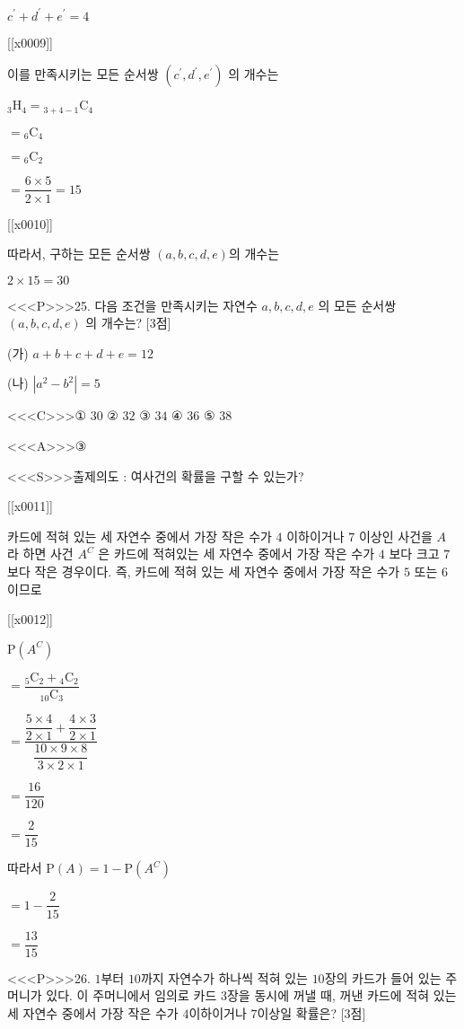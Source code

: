 \documentclass{oblivoir}
\begin{document}
$c^{\prime}+d^{\prime}+e^{\prime}=4$

[[x0009]]

이를 만족시키는 모든 순서쌍 $\left(c^{\prime}, d^{\prime}, e^{\prime}\right)$
의 개수는

${ }_{3} \mathrm{H}_{4}={ }_{3+4-1} \mathrm{C}_{4}$

$={ }_{6} \mathrm{C}_{4}$

$={ }_{6} \mathrm{C}_{2}$

$=\dfrac{6 \times 5}{2 \times 1}=15$

[[x0010]]

따라서, 구하는 모든 순서쌍 $(a, b, c, d, e)$의 개수는

$2 \times 15=30$



<<<P>>>25. 다음 조건을 만족시키는 자연수 $a, b, c, d, e$ 의 모든 순서쌍 $(a, b, c, d, e)$ 의 개수는? [3점]

(가) $a+b+c+d+e=12$

(나) $\left|a^{2}-b^{2}\right|=5$

<<<C>>>① $30$
② $32$
③ $34$
④ $36$
⑤ $38$

<<<A>>>③

<<<S>>>출제의도 : 여사건의 확률을 구할 수 있는가?

[[x0011]]

카드에 적혀 있는 세 자연수 중에서 가장 작은 수가 $4$ 이하이거나 $7$ 이상인 사건을 $A$ 라 하면 사건 $A^{C}$ 은 카드에 적혀있는 세 자연수 중에서 가장 작은 수가 $4$ 보다 크고 $7$ 보다 작은 경우이다. 즉, 카드에 적혀 있는 세 자연수 중에서 가장 작은 수가 $5$ 또는 $6$ 이므로

[[x0012]]

$\mathrm{P}\left(A^{C}\right)$

$=\dfrac{{ }_{5} \mathrm{C}_{2}+{ }_{4} \mathrm{C}_{2}}{{ }_{10} \mathrm{C}_{3}}$

$=\dfrac{\dfrac{5 \times 4}{2 \times 1}+\dfrac{4 \times 3}{2 \times 1}}{\dfrac{10 \times 9 \times 8}{3 \times 2 \times 1}}$

$=\dfrac{16}{120}$

$=\dfrac{2}{15}$

따라서
$\mathrm{P}(A)=1-\mathrm{P}\left(A^{C}\right)$

$=1-\dfrac{2}{15}$

$=\dfrac{13}{15}$


<<<P>>>26. $1$부터 $10$까지 자연수가 하나씩 적혀 있는 $10$장의 카드가 들어 있는 주머니가 있다. 이 주머니에서 임의로 카드 $3$장을 동시에 꺼낼 때, 꺼낸 카드에 적혀 있는 세 자연수 중에서 가장 작은 수가 $4$이하이거나 $7$이상일 확률은? [3점]
\end{document}
